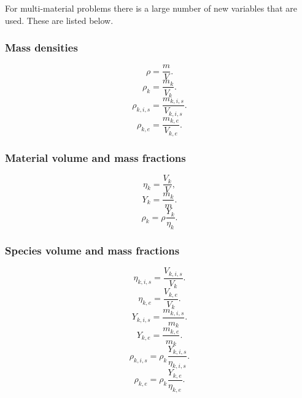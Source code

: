 \documentclass[a4paper,11pt]{report}
\begin{document}
For multi-material problems there is a large number of new variables that are used. These are listed below.
\subsubsection{Mass densities}

\begin{equation}
    \rho = \frac{m}{V}.
\end{equation}
\begin{equation}
    \rho_k= \frac{m_k}{V_k}.
\end{equation}
\begin{equation}
    \rho_{k,i,s}= \frac{m_{k,i,s}}{V_{k,i,s}}.
\end{equation}
\begin{equation}
    \rho_{k,e}= \frac{m_{k,e}}{V_{k,e}}.
\end{equation}

\subsubsection{Material volume and mass fractions}

\begin{equation}
    \eta_k = \frac{V_k}{V},
\end{equation}
\begin{equation}
    Y_k = \frac{m_k}{m}.
\end{equation}
\begin{equation}
    \rho_k = \rho \frac{Y_k}{\eta_k}.
\end{equation}
 
\subsubsection{Species volume and mass fractions}

\begin{equation}
    \eta_{k,i,s} = \frac{V_{k,i,s}}{V_k}.
\end{equation}
\begin{equation}
    \eta_{k,e} = \frac{V_{k,e}}{V_k}.
\end{equation}
\begin{equation}
    Y_{k,i,s} = \frac{m_{k,i,s}}{m_k}.
\end{equation}
\begin{equation}
    Y_{k,e} = \frac{m_{k,e}}{m_k}.
\end{equation}
\begin{equation}
    \rho_{k,i,s} = \rho_k \frac{Y_{k,i,s}}{\eta_{k,i,s}}.
\end{equation}
\begin{equation}
    \rho_{k,e} = \rho_k \frac{Y_{k,e}}{\eta_{k,e}}.
\end{equation}
\end{document}
